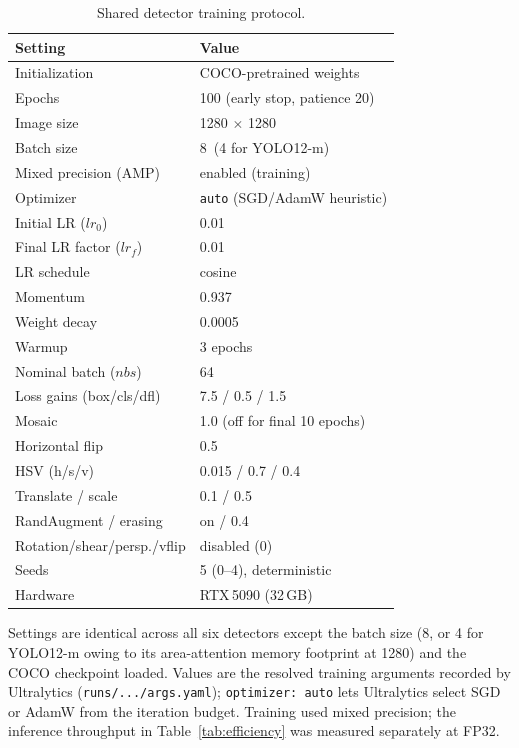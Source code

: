 \begin{table}[ht]
  \centering
  \caption{Shared detector training protocol.}
  \label{tab:training_protocol}
  \begin{tabular}{ll}
    \toprule
    Setting & Value \\
    \midrule
    Initialization        & COCO-pretrained weights \\
    Epochs                & 100 (early stop, patience 20) \\
    Image size            & 1280 $\times$ 1280 \\
    Batch size            & 8 \,(4 for YOLO12-m) \\
    Mixed precision (AMP) & enabled (training) \\
    \addlinespace
    Optimizer             & \texttt{auto} (SGD/AdamW heuristic) \\
    Initial LR ($lr_0$)   & 0.01 \\
    Final LR factor ($lr_f$) & 0.01 \\
    LR schedule           & cosine \\
    Momentum              & 0.937 \\
    Weight decay          & 0.0005 \\
    Warmup                & 3 epochs \\
    Nominal batch ($nbs$) & 64 \\
    Loss gains (box/cls/dfl) & 7.5 / 0.5 / 1.5 \\
    \addlinespace
    Mosaic                & 1.0 (off for final 10 epochs) \\
    Horizontal flip       & 0.5 \\
    HSV (h/s/v)           & 0.015 / 0.7 / 0.4 \\
    Translate / scale     & 0.1 / 0.5 \\
    RandAugment / erasing & on / 0.4 \\
    Rotation/shear/persp./vflip & disabled (0) \\
    \addlinespace
    Seeds                 & 5 (0--4), deterministic \\
    Hardware              & RTX\,5090 (32\,GB) \\
    \bottomrule
  \end{tabular}
  \par\smallskip
  \footnotesize Settings are identical across all six detectors except the batch size (8, or 4 for YOLO12-m owing to its area-attention memory footprint at 1280) and the COCO checkpoint loaded. Values are the resolved training arguments recorded by Ultralytics (\texttt{runs/.../args.yaml}); \texttt{optimizer: auto} lets Ultralytics select SGD or AdamW from the iteration budget. Training used mixed precision; the inference throughput in Table~\ref{tab:efficiency} was measured separately at FP32.
\end{table}
